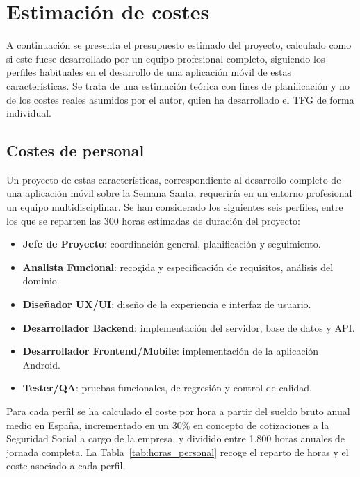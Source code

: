\section{Estimación de costes}\label{cap:estimacionCostes}

A continuación se presenta el presupuesto estimado del proyecto, calculado como si este fuese desarrollado por un equipo profesional completo, siguiendo los perfiles habituales en el desarrollo de una aplicación móvil de estas características. Se trata de una estimación teórica con fines de planificación y no de los costes reales asumidos por el autor, quien ha desarrollado el TFG de forma individual.

\subsection{Costes de personal}

Un proyecto de estas características, correspondiente al desarrollo completo de una aplicación móvil sobre la Semana Santa, requeriría en un entorno profesional un equipo multidisciplinar. Se han considerado los siguientes seis perfiles, entre los que se reparten las 300 horas estimadas de duración del proyecto:

\begin{itemize}
    \item \textbf{Jefe de Proyecto}: coordinación general, planificación y seguimiento.
    \item \textbf{Analista Funcional}: recogida y especificación de requisitos, análisis del dominio.
    \item \textbf{Diseñador UX/UI}: diseño de la experiencia e interfaz de usuario.
    \item \textbf{Desarrollador Backend}: implementación del servidor, base de datos y API.
    \item \textbf{Desarrollador Frontend/Mobile}: implementación de la aplicación Android.
    \item \textbf{Tester/QA}: pruebas funcionales, de regresión y control de calidad.
\end{itemize}

Para cada perfil se ha calculado el coste por hora a partir del sueldo bruto anual medio en España, incrementado en un 30\% en concepto de cotizaciones a la Seguridad Social a cargo de la empresa, y dividido entre 1.800 horas anuales de jornada completa. La Tabla~\ref{tab:horas_personal} recoge el reparto de horas y el coste asociado a cada perfil.

